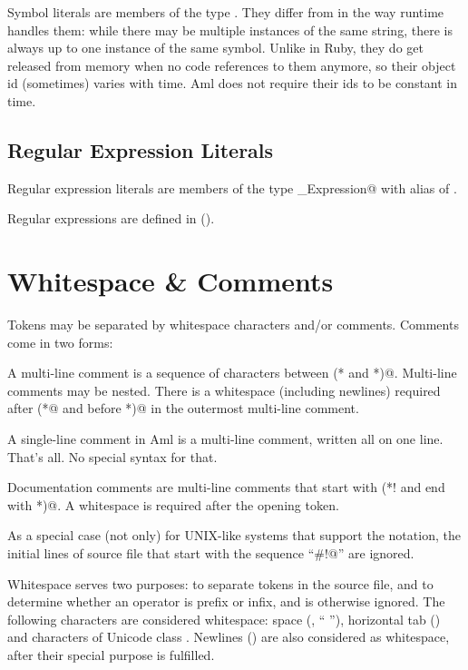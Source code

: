 Symbol literals are members of the type \lstinline@Symbol@. They differ from  in the way runtime handles them: while there may be multiple instances of the same string, there is always up to one instance of the same symbol. Unlike in Ruby, they do get released from memory when no code references to them anymore, so their object id (sometimes) varies with time. Aml does not require their ids to be constant in time. 









\subsection{Regular Expression Literals}
\label{sec:regexpliterals}

Regular expression literals are members of the type \lstinline@Regular_Expression@ with alias of \lstinline@Regexp@. 

Regular expressions are defined in (). 





\section{Whitespace \& Comments}
\label{sec:whitespacecomments}

Tokens may be separated by whitespace characters and/or comments. Comments come in two forms: 

A multi-line comment is a sequence of characters between \lstinline@(* and *)@. Multi-line comments may be nested. There is a whitespace (including newlines) required after \lstinline@(*@ and before \lstinline@*)@ in the outermost multi-line comment. 

A single-line comment in Aml is a multi-line comment, written all on one line. That's all. No special syntax for that. 

Documentation comments are multi-line comments that start with \lstinline@(*! and end with *)@. A whitespace is required after the opening token. 

As a special case (not only) for UNIX-like systems that support the notation, the initial lines of source file that start with the sequence ``\lstinline@#!@'' are ignored. 

Whitespace serves two purposes: to separate tokens in the source file, and to determine whether an operator is prefix or infix, and is otherwise ignored. The following characters are considered whitespace: space (, `` ''), horizontal tab () and characters of Unicode class . Newlines () are also considered as whitespace, after their special purpose is fulfilled. 

